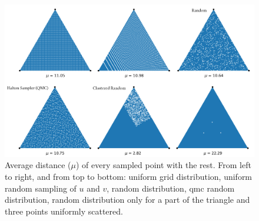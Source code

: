 \begin{figure}
    \centering
    \includegraphics[width=\linewidth]{figs/lidar_optimization/distance_metric.png}
	\caption{Average distance ($\mu$) of every sampled point with the rest. From left to right, and from top to bottom: uniform grid distribution, uniform random sampling of $u$ and $v$, random distribution, \acrshort{qmc} random distribution, random distribution only for a part of the triangle and three points uniformly scattered.}
	\label{fig:f2_metric}
\end{figure}


